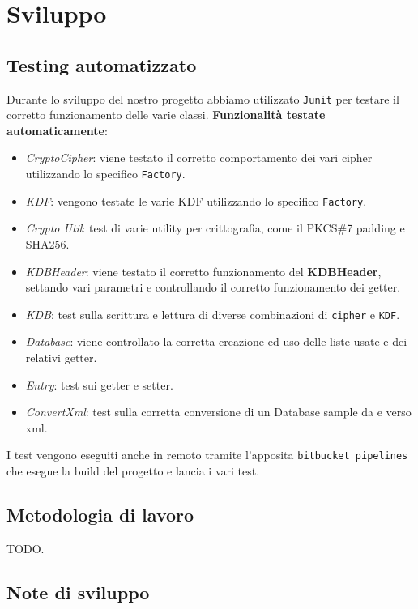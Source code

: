 \documentclass[a4paper,12pt]{report}
\begin{document}
\chapter{Sviluppo}
\section{Testing automatizzato}

Durante lo sviluppo del nostro progetto abbiamo utilizzato \texttt{Junit} per
testare il corretto funzionamento delle varie classi.
\textbf{Funzionalità testate automaticamente}:
\begin{itemize}
  \item \textit{CryptoCipher}: viene testato il corretto comportamento dei vari cipher utilizzando lo specifico \texttt{Factory}.
  \item \textit{KDF}: vengono testate le varie KDF utilizzando lo specifico \texttt{Factory}.
  \item \textit{Crypto Util}: test di varie utility per crittografia, come il PKCS\#7 padding e SHA256.
  \item \textit{KDBHeader}: viene testato il corretto funzionamento del \textbf{KDBHeader}, settando vari parametri e controllando il corretto funzionamento dei getter.
  \item \textit{KDB}: test sulla scrittura e lettura di diverse combinazioni di \texttt{cipher} e \texttt{KDF}.
  \item \textit{Database}: viene controllato la corretta creazione ed uso delle liste usate e dei relativi getter.
  \item \textit{Entry}: test sui getter e setter.
  \item \textit{ConvertXml}: test sulla corretta conversione di un Database sample da e verso xml.
\end{itemize}

I test vengono eseguiti anche in remoto tramite l'apposita \texttt{bitbucket pipelines} che
esegue la build del progetto e lancia i vari test.

\section{Metodologia di lavoro}

TODO.

\section{Note di sviluppo}
\end{document}
